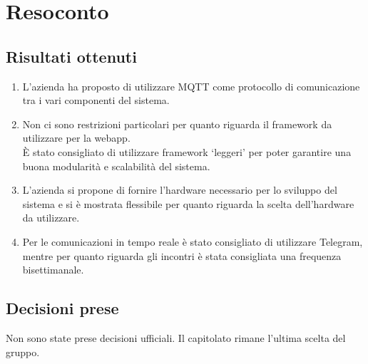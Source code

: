 \section{Resoconto}

\subsection{Risultati ottenuti}
\begin{enumerate}
    \item L'azienda ha proposto di utilizzare MQTT come protocollo di comunicazione tra i vari componenti del sistema.
    \item Non ci sono restrizioni particolari per quanto riguarda il framework da utilizzare per la webapp. \\ È stato consigliato di utilizzare framework `leggeri' per poter garantire una buona modularità e scalabilità del sistema.
    \item L'azienda si propone di fornire l'hardware necessario per lo sviluppo del sistema e si è mostrata flessibile per quanto riguarda la scelta dell'hardware da utilizzare.
    \item Per le comunicazioni in tempo reale  è stato consigliato di utilizzare Telegram, mentre per quanto riguarda gli incontri è stata consigliata una frequenza bisettimanale.
\end{enumerate}

\subsection{Decisioni prese}
Non sono state prese decisioni ufficiali. Il capitolato rimane l'ultima scelta del gruppo.
